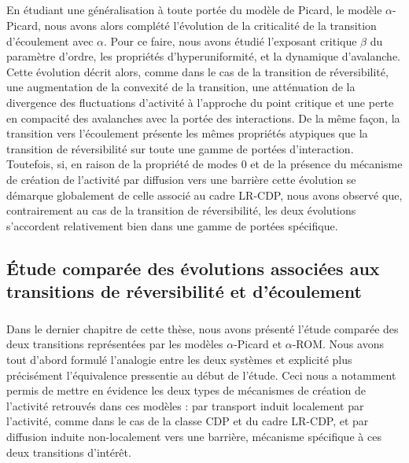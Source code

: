 \subparagraph{}En étudiant une généralisation à toute portée du modèle de Picard, le modèle $\alpha$-Picard, nous avons alors complété l'évolution de la criticalité de la transition d'écoulement avec $\alpha$. Pour ce faire, nous avons étudié l'exposant critique $\beta$ du paramètre d'ordre, les propriétés d'hyperuniformité, et la dynamique d'avalanche. Cette évolution décrit alors, comme dans le cas de la transition de réversibilité, une augmentation de la convexité de la transition, une atténuation de la divergence des fluctuations d'activité à l'approche du point critique et une perte en compacité des avalanches avec la portée des interactions. De la même façon, la transition vers l'écoulement présente les mêmes propriétés atypiques que la transition de réversibilité sur toute une gamme de portées d'interaction.  Toutefois, si, en raison de la propriété de modes 0 et de la présence du mécanisme de création de l'activité par diffusion vers une barrière cette évolution se démarque globalement de celle associé au cadre LR-CDP, nous avons observé que, contrairement au cas de la transition de réversibilité, les deux évolutions s'accordent relativement bien dans une gamme de portées spécifique.

\subsection*{Étude comparée des évolutions associées aux transitions de réversibilité et d'écoulement}

\subparagraph{}Dans le dernier chapitre de cette thèse, nous avons présenté l'étude comparée des deux transitions représentées par les modèles $\alpha$-Picard et $\alpha$-ROM. Nous avons tout d'abord formulé l'analogie entre les deux systèmes et explicité plus précisément l'équivalence pressentie au début de l'étude. Ceci nous a notamment permis de mettre en évidence les deux types de mécanismes de création de l'activité retrouvés dans ces modèles : par transport induit localement par l'activité, comme dans le cas de la classe CDP et du cadre LR-CDP, et par diffusion induite non-localement vers une barrière, mécanisme spécifique à ces deux transitions d'intérêt.

